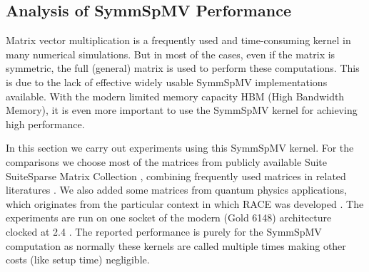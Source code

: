 \subsection{Analysis of SymmSpMV Performance} \label{subsec:perf_symm_spmv}
Matrix vector multiplication is a frequently used and time-consuming kernel in
many numerical simulations. But in most of the cases, even if the matrix is symmetric,
the full (general) matrix is used to perform these computations.
This is due to the lack of effective widely usable \acrshort{SymmSpMV} implementations available.
With the modern limited memory capacity HBM (High Bandwidth Memory), it 
is even more important to use the \acrshort{SymmSpMV} kernel for achieving high performance.

In this section we carry out experiments using this \acrshort{SymmSpMV} kernel.
For the comparisons we choose most of the matrices from publicly available Suite
SuiteSparse Matrix Collection \cite{UOF}, combining frequently 
used matrices in related literatures \cite{RSB,park_ls}. We also added
some matrices from quantum physics applications, which originates from 
the particular context in which \acrshort{RACE} was developed \cite{ESSEX}.
The experiments are
run on one socket of the modern \Intel \SKX (Gold 6148) architecture
clocked at 2.4 \GHZ. The reported performance is purely for the \acrshort{SymmSpMV}
computation as normally these kernels are called multiple times making other
costs (like setup time) negligible.

